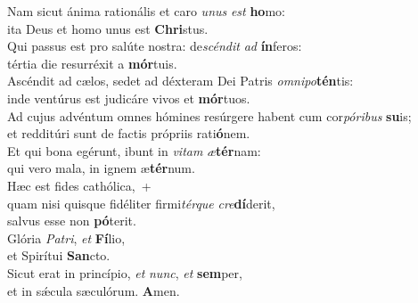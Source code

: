\oddverse Nam sicut ánima rationális et caro \textit{u}\textit{nus} \textit{est} \textbf{ho}mo:~\*\\
\oddverse ita Deus et homo unus est \textbf{Chri}stus.\\
\evenverse Qui passus est pro salúte nostra: de\textit{scén}\textit{dit} \textit{ad} \textbf{ín}feros:~\*\\
\evenverse tértia die resurréxit a \textbf{mór}tuis.\\
\oddverse Ascéndit ad cælos, sedet ad déxteram Dei Patris \textit{om}\textit{ni}\textit{po}\textbf{tén}tis:~\*\\
\oddverse inde ventúrus est judicáre vivos et \textbf{mór}tuos.\\
\evenverse Ad cujus advéntum omnes hómines resúrgere habent cum cor\textit{pó}\textit{ri}\textit{bus} \textbf{su}is;~\*\\
\evenverse et redditúri sunt de factis própriis rati\textbf{ó}nem.\\
\oddverse Et qui bona egérunt, ibunt in \textit{vi}\textit{tam} \textit{æ}\textbf{tér}nam:~\*\\
\oddverse qui vero mala, in ignem æ\textbf{tér}num.\\
\evenverse Hæc est fides cathólica,~+\\
\evenverse  quam nisi quisque fidéliter firmi\textit{tér}\textit{que} \textit{cre}\textbf{dí}derit,~\*\\
\evenverse salvus esse non \textbf{pó}terit.\\
\oddverse Glória \textit{Pa}\textit{tri}, \textit{et} \textbf{Fí}lio,~\*\\
\oddverse et Spirítui \textbf{San}cto.\\
\evenverse Sicut erat in princípio, \textit{et} \textit{nunc}, \textit{et} \textbf{sem}per,~\*\\
\evenverse et in sǽcula sæculórum. \textbf{A}men.\\
